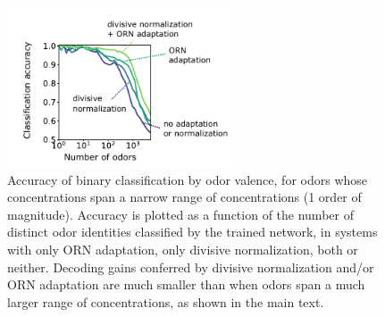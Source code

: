 \documentclass[10pt,prl,aps,showpacs,twocolumn,unsortedaddress,showkeys,linenumbers]{revtex4-1}
\begin{document}
\renewcommand\thefigure{\ref{fig:downstream}--figure supplement 1}  



\begin{figure}
    \centering
    \includegraphics[width=0.6\textwidth]{figures/5_downstream_SI.pdf}
    \caption{Accuracy of binary classification  by odor valence, for odors whose concentrations span a narrow range of concentrations (1 order of magnitude). Accuracy is plotted as a function of the number of distinct odor identities classified by the trained network, in systems with only ORN adaptation, only divisive normalization, both or neither. Decoding gains conferred by divisive normalization and/or ORN adaptation are much smaller than when odors span a much larger range of concentrations, as shown in the main text.}
    \label{fig:SI_downstream}
\end{figure}
\end{document}
